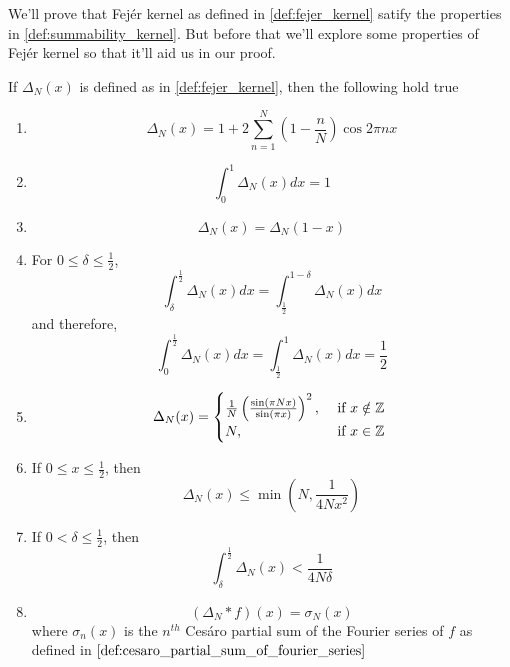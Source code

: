  We'll prove that Fej\'er kernel as defined in \ref{def:fejer_kernel} satify the properties in \ref{def:summability_kernel}. But before that we'll explore some properties of Fej\'er kernel so that it'll aid us in our proof.
  \begin{proposition}
    \label{prop:properties_of_fejer_kernel}
    If $\Delta_N(x)$ is defined as in \ref{def:fejer_kernel}, then the following hold true
    \begin{enumerate}[label=(\alph*)]
      \item
        $$\Delta_N(x) = 1 + 2 \sum_{n=1}^{N} ( 1-\frac{n}{N} )\cos{2\pi nx}$$ 
      \item
        $$\int_0^1 \Delta_N(x) dx = 1$$
      \item 
        $$\Delta_N(x) = \Delta_N(1-x)$$
    
\item For $0\le \delta \le \frac{1}{2}$,
        $$\int_\delta^{\frac{1}{2}} \Delta_N(x) dx = \int_{\frac{1}{2}}^{1 - \delta} \Delta_N(x) dx$$
        and therefore,
        $$\int_0^{\frac{1}{2}} \Delta_N(x) dx = \int_{\frac{1}{2}}^{1} \Delta_N(x) dx = \frac{1}{2}$$
      
      \item
        \begin{displaymath}
          \Delta_N(x) = 
            \begin{cases}
              \frac{1}{N}\left( \frac{\sin(\pi Nx)}{\sin(\pi x)} \right)^2, &\text{ if } x\notin \mathbb Z \\
              N, &\text{ if } x \in \mathbb Z\
            \end{cases}
        \end{displaymath}
      \item
        If $0\le x \le \frac{1}{2}$, then $$\Delta_N(x) \le \min\left(N, \frac{1}{4Nx^2}\right)$$
      \item 
        If $0<\delta \le \frac{1}{2}$, then 
        $$\int_\delta^{\frac{1}{2}}\Delta_N(x) < \frac{1}{4N\delta}$$
      \item 
        \begin{displaymath}
          (\Delta_N*f)(x) = \sigma_N(x) 
        \end{displaymath}
        where $\sigma_n(x)$ is the $n^{th}$ Ces\'aro partial sum of the Fourier series of $f$ as defined in $\ref{def:cesaro_partial_sum_of_fourier_series}$
    \end{enumerate}
  \end{proposition}

